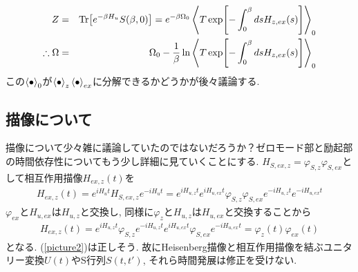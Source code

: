 \documentclass[10.5pt,a4paper]{jreport}
\begin{document}

\begin{eqnarray}
  Z &=& \Tr[e^{-\beta H_u}S(\beta, 0)] = e^{-\beta\Omega_0}\ev{T\exp[-\int_0^\beta ds H_{z, ex}(s)]}_0\\
  \therefore \Omega &=& \Omega_0 -\frac{1}{\beta}\ln\ev{T\exp[-\int_0^\beta ds H_{z, ex}(s)]}_0\label{Perturbed-thermo2}
\end{eqnarray}
この$\ev{\bullet}_0$が$\ev{\bullet}_{z}\ev{\bullet}_{ex}$に分解できるかどうかが後々議論する. 

\subsection{描像について}
描像について少々雑に議論していたのではないだろうか？ゼロモード部と励起部の時間依存性についてもう少し詳細に見ていくことにする. $H_{S, ex, z} = \varphi_{S, z}\varphi_{S, ex}$として相互作用描像$H_{ex, z}(t)$を
\begin{eqnarray}
  H_{ex, z}(t) = e^{iH_ut}H_{S, ex, z}e^{-iH_ut} = e^{iH_{u, z}t}e^{iH_{u, ex}t}\varphi_{S, z}\varphi_{S, ex}e^{-iH_{u, z}t}e^{-iH_{u, ex}t}
\end{eqnarray}
$\varphi_{ex}$と$H_{u, ex}$は$H_{u, z}$と交換し, 同様に$\varphi_{z}$と$H_{u, z}$は$H_{u, ex}$と交換することから
\begin{eqnarray}
  H_{ex, z}(t) = e^{iH_{u, z}t}\varphi_{S, z}e^{-iH_{u, z}t}e^{iH_{u, ex}t}\varphi_{S, ex}e^{-iH_{u, ex}t} = \varphi_{z}(t)\varphi_{ex}(t)
\end{eqnarray}
となる. (\ref{picture2})は正しそう. 故にHeisenberg描像と相互作用描像を結ぶユニタリー変換$U(t)$やS行列$S(t, t')$, それら時間発展は修正を受けない.
\end{document}
